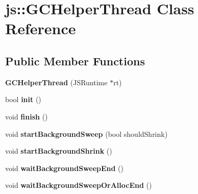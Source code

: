 \hypertarget{classjs_1_1_g_c_helper_thread}{\section{js\-:\-:G\-C\-Helper\-Thread Class Reference}
\label{classjs_1_1_g_c_helper_thread}
}
\subsection*{Public Member Functions}
\begin{DoxyCompactItemize}
\item 
\hypertarget{classjs_1_1_g_c_helper_thread_a471324a5e9cffa628bafd266f0d03f9a}{{\bfseries G\-C\-Helper\-Thread} (J\-S\-Runtime $\ast$rt)}\label{classjs_1_1_g_c_helper_thread_a471324a5e9cffa628bafd266f0d03f9a}

\item 
\hypertarget{classjs_1_1_g_c_helper_thread_a67f7d14c709c6dba645886a1daaa8432}{bool {\bfseries init} ()}\label{classjs_1_1_g_c_helper_thread_a67f7d14c709c6dba645886a1daaa8432}

\item 
\hypertarget{classjs_1_1_g_c_helper_thread_a5965238564f3787ffe39c34815ce527d}{void {\bfseries finish} ()}\label{classjs_1_1_g_c_helper_thread_a5965238564f3787ffe39c34815ce527d}

\item 
\hypertarget{classjs_1_1_g_c_helper_thread_a44da6b1cfecf03b8f24e78e9381983fb}{void {\bfseries start\-Background\-Sweep} (bool should\-Shrink)}\label{classjs_1_1_g_c_helper_thread_a44da6b1cfecf03b8f24e78e9381983fb}

\item 
\hypertarget{classjs_1_1_g_c_helper_thread_a353ee432f676aa92a09641c4e1047163}{void {\bfseries start\-Background\-Shrink} ()}\label{classjs_1_1_g_c_helper_thread_a353ee432f676aa92a09641c4e1047163}

\item 
\hypertarget{classjs_1_1_g_c_helper_thread_a6c669746d133b8ab3aac8798d6a7e8bd}{void {\bfseries wait\-Background\-Sweep\-End} ()}\label{classjs_1_1_g_c_helper_thread_a6c669746d133b8ab3aac8798d6a7e8bd}

\item 
\hypertarget{classjs_1_1_g_c_helper_thread_adb5e740aaf5c0a21fcedf6c30ad9fa19}{void {\bfseries wait\-Background\-Sweep\-Or\-Alloc\-End} ()}\label{classjs_1_1_g_c_helper_thread_adb5e740aaf5c0a21fcedf6c30ad9fa19}


\end{DoxyCompactItemize}
